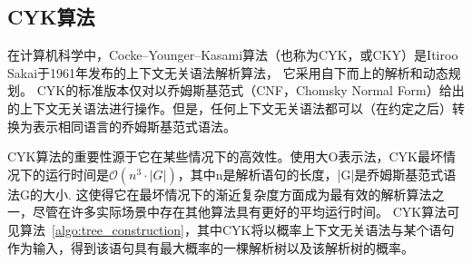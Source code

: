 



\subsection{CYK算法}

在计算机科学中，Cocke–Younger–Kasami算法（也称为CYK，或CKY）是Itiroo Sakai\cite{mey1965international}于1961年发布的上下文无关语法解析算法，
它采用自下而上的解析和动态规划。
CYK的标准版本仅对以乔姆斯基范式（CNF，Chomsky Normal Form）给出的上下文无关语法进行操作。但是，任何上下文无关语法都可以（在约定之后）转换为表示相同语言的乔姆斯基范式语法。

CYK算法的重要性源于它在某些情况下的高效性。使用大O表示法，CYK最坏情况下的运行时间是$\displaystyle \mathcal{O} (n^{3} \cdot |G|)$，其中n是解析语句的长度，|G|是乔姆斯基范式语法G的大小.
这使得它在最坏情况下的渐近复杂度方面成为最有效的解析算法之一，尽管在许多实际场景中存在其他算法具有更好的平均运行时间\cite{sipser1997context}。
CYK算法可见算法~\ref{algo:tree_construction}，其中CYK将以概率上下文无关语法与某个语句作为输入，得到该语句具有最大概率的一棵解析树以及该解析树的概率。

